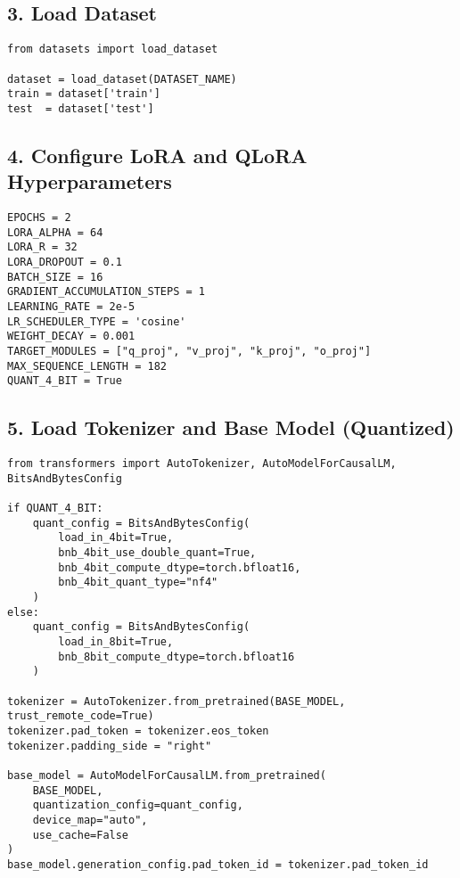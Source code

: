 \documentclass[a4paper, 12pt]{article}
\begin{document}
\subsection*{3. Load Dataset}
\begin{tcolorbox}[colback=green!5!white, colframe=green!75!black, title=Load Dataset from Hub]
\begin{verbatim}
from datasets import load_dataset

dataset = load_dataset(DATASET_NAME)
train = dataset['train']
test  = dataset['test']
\end{verbatim}
\end{tcolorbox}

\subsection*{4. Configure LoRA and QLoRA Hyperparameters}
\begin{tcolorbox}[colback=yellow!5!white, colframe=yellow!75!black, title=LoRA and Quantization Settings]
\begin{verbatim}
EPOCHS = 2
LORA_ALPHA = 64
LORA_R = 32
LORA_DROPOUT = 0.1
BATCH_SIZE = 16
GRADIENT_ACCUMULATION_STEPS = 1
LEARNING_RATE = 2e-5
LR_SCHEDULER_TYPE = 'cosine'
WEIGHT_DECAY = 0.001
TARGET_MODULES = ["q_proj", "v_proj", "k_proj", "o_proj"]
MAX_SEQUENCE_LENGTH = 182
QUANT_4_BIT = True
\end{verbatim}
\end{tcolorbox}

\subsection*{5. Load Tokenizer and Base Model (Quantized)}
\begin{tcolorbox}[colback=blue!5!white, colframe=blue!75!black, title=Tokenizer \& Quantized Model]
\begin{verbatim}
from transformers import AutoTokenizer, AutoModelForCausalLM, BitsAndBytesConfig

if QUANT_4_BIT:
    quant_config = BitsAndBytesConfig(
        load_in_4bit=True,
        bnb_4bit_use_double_quant=True,
        bnb_4bit_compute_dtype=torch.bfloat16,
        bnb_4bit_quant_type="nf4"
    )
else:
    quant_config = BitsAndBytesConfig(
        load_in_8bit=True,
        bnb_8bit_compute_dtype=torch.bfloat16
    )

tokenizer = AutoTokenizer.from_pretrained(BASE_MODEL, trust_remote_code=True)
tokenizer.pad_token = tokenizer.eos_token
tokenizer.padding_side = "right"

base_model = AutoModelForCausalLM.from_pretrained(
    BASE_MODEL,
    quantization_config=quant_config,
    device_map="auto",
    use_cache=False
)
base_model.generation_config.pad_token_id = tokenizer.pad_token_id
\end{verbatim}
\end{tcolorbox}
\end{document}
